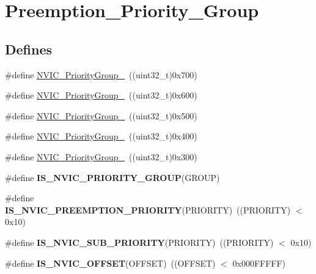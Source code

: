 \hypertarget{group__Preemption__Priority__Group}{
\section{Preemption\_\-Priority\_\-Group}
\label{group__Preemption__Priority__Group}
}
\subsection*{Defines}
\begin{DoxyCompactItemize}
\item 
\#define \hyperlink{group__Preemption__Priority__Group_gaeac0cf537f65d17bc19aee2410b2b60e}{NVIC\_\-PriorityGroup\_}~((uint32\_\-t)0x700)
\item 
\#define \hyperlink{group__Preemption__Priority__Group_ga89bf0bf9e70f1a372a541b1b8d7493aa}{NVIC\_\-PriorityGroup\_}~((uint32\_\-t)0x600)
\item 
\#define \hyperlink{group__Preemption__Priority__Group_ga505002e8b76aef65499ca371e40ec8b4}{NVIC\_\-PriorityGroup\_}~((uint32\_\-t)0x500)
\item 
\#define \hyperlink{group__Preemption__Priority__Group_ga49bdbee77d4a70339d63c80462d49b4d}{NVIC\_\-PriorityGroup\_}~((uint32\_\-t)0x400)
\item 
\#define \hyperlink{group__Preemption__Priority__Group_gaf9020c585da2a299328f0b06dee391a2}{NVIC\_\-PriorityGroup\_}~((uint32\_\-t)0x300)
\item 
\#define {\bfseries IS\_\-NVIC\_\-PRIORITY\_\-GROUP}(GROUP)
\item 
\hypertarget{group__Preemption__Priority__Group_gaf30fd8f5960c2e28a772d8f16bb156dd}{
\#define {\bfseries IS\_\-NVIC\_\-PREEMPTION\_\-PRIORITY}(PRIORITY)~((PRIORITY) $<$ 0x10)}
\label{group__Preemption__Priority__Group_gaf30fd8f5960c2e28a772d8f16bb156dd}

\item 
\hypertarget{group__Preemption__Priority__Group_ga010705bc997dcff935b965b372cba61d}{
\#define {\bfseries IS\_\-NVIC\_\-SUB\_\-PRIORITY}(PRIORITY)~((PRIORITY) $<$ 0x10)}
\label{group__Preemption__Priority__Group_ga010705bc997dcff935b965b372cba61d}

\item 
\hypertarget{group__Preemption__Priority__Group_ga1184bbb97d758385f98ab40dd5e5af59}{
\#define {\bfseries IS\_\-NVIC\_\-OFFSET}(OFFSET)~((OFFSET) $<$ 0x000FFFFF)}
\label{group__Preemption__Priority__Group_ga1184bbb97d758385f98ab40dd5e5af59}

\end{DoxyCompactItemize}



